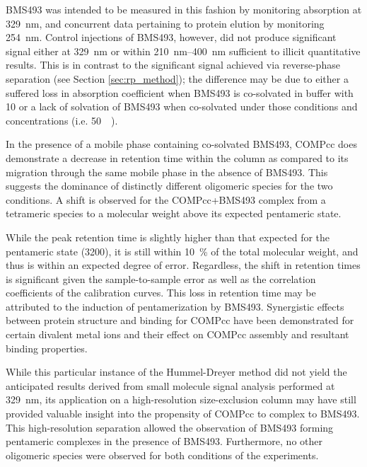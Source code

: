 \begin{refsection}
BMS493 was intended to be measured in this fashion by monitoring absorption at
\SI{329}{\nm}, and concurrent data pertaining to protein elution by monitoring
\SI{254}{\nm}.  Control injections of BMS493, however, did not produce
significant signal either at \SI{329}{\nm} or within \SIrange{210}{400}{\nm}
sufficient to illicit quantitative results. This is in contrast to the
significant signal achieved via reverse-phase separation (see Section
\ref{sec:rp_method}); the difference may be due to either a suffered loss in
absorption coefficient when BMS493 is co-solvated in buffer with
\SI{10}{\volper} or a lack of solvation of BMS493 when co-solvated under those
conditions and concentrations (i.e.  \SI{50}{\micro\moLar}).

In the presence of a mobile phase containing co-solvated BMS493, COMPcc does
demonstrate a decrease in retention time within the column as compared to its
migration through the same mobile phase in the absence of BMS493. This suggests
the dominance of distinctly different oligomeric species for the two conditions.
A shift is observed for the COMPcc+BMS493 complex from a tetrameric species to a
molecular weight above its expected pentameric state. 

While the peak retention time is slightly higher than that expected for the
pentameric state (\SI{3200}{\Da}), it is still within \SI{10}{\percent} of the
total molecular weight, and thus is within an expected degree of error.
Regardless, the shift in retention times is significant given the
sample-to-sample error as well as the correlation coefficients of the
calibration curves.
This loss in retention time may be attributed to the induction of
pentamerization by BMS493. Synergistic effects between protein structure and
binding for COMPcc have been demonstrated for certain divalent metal ions and
their effect on COMPcc assembly and resultant binding
properties.\cite{Gunasekar2012}

While this particular instance of the Hummel-Dreyer method did not yield the
anticipated results derived from small molecule signal analysis performed at
\SI{329}{\nm}, its application on a high-resolution size-exclusion column may
have still provided valuable insight into the propensity of COMPcc to complex to
BMS493. This high-resolution separation allowed the observation of BMS493
forming pentameric complexes in the presence of BMS493. Furthermore, no other
oligomeric species were observed for both conditions of the experiments.


\end{refsection}
